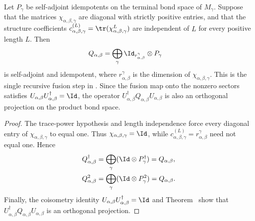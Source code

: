 \begin{lemma}%
    \label{thm:mpdo_topological_projector_one_fusion}
    \leanok
    Let $P_\gamma$ be self-adjoint idempotents on the terminal bond space of
    $M_\gamma$. Suppose that the matrices $\chi_{\alpha,\beta,\gamma}$ are
    diagonal with strictly positive entries, and that the structure
    coefficients
    $c_{\alpha,\beta,\gamma}^{(L)}
        =\tr(\chi_{\alpha,\beta,\gamma}^{L})$ are independent of $L$ for every
    positive length $L$. Then
    \begin{align}
        Q_{\alpha,\beta}
         & =\bigoplus_\gamma
        \Id_{r_{\alpha,\beta}^{\gamma}}\otimes P_\gamma
        \notag
    \end{align}
    is self-adjoint and idempotent, where $r_{\alpha,\beta}^{\gamma}$ is
    the dimension of $\chi_{\alpha,\beta,\gamma}$.
    This is the single recursive fusion step in
    \cite[lines~999--1010]{Cirac2016MPDO_arXiv}.
    Since the fusion map onto the nonzero sectors satisfies
    $U_{\alpha,\beta}U_{\alpha,\beta}^{\dagger}=\Id$, the operator
    $U_{\alpha,\beta}^{\dagger}Q_{\alpha,\beta}U_{\alpha,\beta}$ is also an
    orthogonal projection on the product bond space.
\end{lemma}
\begin{proof}\leanok
    The trace-power hypothesis and length independence force every diagonal
    entry of $\chi_{\alpha,\beta,\gamma}$ to equal one. Thus
    $\chi_{\alpha,\beta,\gamma}=\Id$, while
    $c_{\alpha,\beta,\gamma}^{(L)}=r_{\alpha,\beta}^{\gamma}$ need not equal
    one. Hence
    \begin{align}
        Q_{\alpha,\beta}^{\dagger}
         & =\bigoplus_\gamma(\Id\otimes P_\gamma^{\dagger})
        =Q_{\alpha,\beta},
        \notag                                              \\
        Q_{\alpha,\beta}^{2}
         & =\bigoplus_\gamma(\Id\otimes P_\gamma^{2})
        =Q_{\alpha,\beta}.
        \notag
    \end{align}
    Finally, the coisometry identity
    $U_{\alpha,\beta}U_{\alpha,\beta}^{\dagger}=\Id$ and
    Theorem~\cite[``Coisometric transport of a star projection'']{QICLean2026Blueprint} show that
    $U_{\alpha,\beta}^{\dagger}Q_{\alpha,\beta}U_{\alpha,\beta}$ is an
    orthogonal projection.
\end{proof}

